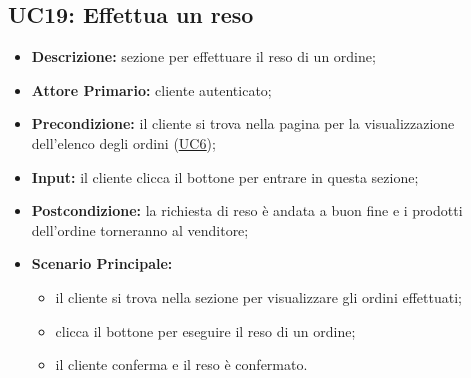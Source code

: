 \subsection{UC19: Effettua un reso}
\label{sec:UC19}
\begin{itemize}
    \item \textbf{Descrizione:} sezione per effettuare il reso di un ordine;
    \item \textbf{Attore Primario:} cliente autenticato;
    \item \textbf{Precondizione:} il cliente si trova nella pagina per la visualizzazione dell'elenco degli ordini (\hyperref[sec:UC6]{\underline{UC6}});
    \item \textbf{Input:} il cliente clicca il bottone per entrare in questa sezione;
    \item \textbf{Postcondizione:} la richiesta di reso è andata a buon fine e i prodotti dell'ordine torneranno al venditore;
    \item \textbf{Scenario Principale:}
        \begin{itemize}
            \item il cliente si trova nella sezione per visualizzare gli ordini effettuati;
            \item clicca il bottone per eseguire il reso di un ordine;
            \item il cliente conferma e il reso è confermato.
        \end{itemize}
\end{itemize}